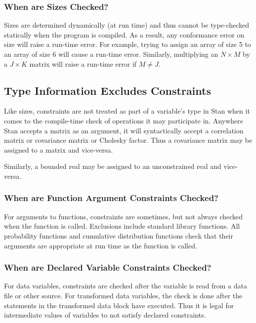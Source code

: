 \subsubsection{When are Sizes Checked?}

Sizes are determined dynamically (at run time) and thus cannot be
type-checked statically when the program is compiled.  As a result,
any conformance error on size will raise a run-time error.  For
example, trying to assign an array of size 5 to an array of size 6
will cause a run-time error.  Similarly, multiplying an $N
\times M$ by a $J \times K$ matrix will raise a run-time error if $M
\neq J$.

\subsection{Type Information Excludes Constraints}

Like sizes, constraints are not treated as part of a variable's type
in Stan when it comes to the compile-time check of operations it may
participate in.  Anywhere Stan accepts a matrix as an argument, it
will syntactically accept a correlation matrix or covariance matrix or
Cholesky factor.  Thus a covariance matrix may be assigned to a matrix
and vice-versa.

Similarly, a bounded real may be assigned to an unconstrained real and
vice-versa.

\subsubsection{When are Function Argument Constraints Checked?}

For arguments to functions, constraints are sometimes, but not always
checked when the function is called.  Exclusions include \Cpp standard
library functions.  All probability functions and cumulative
distribution functions check that their arguments are appropriate at
run time as the function is called.

\subsubsection{When are Declared Variable Constraints Checked?}

For data variables, constraints are checked after the variable is read
from a data file or other source.  For transformed data variables, the
check is done after the statements in the transformed data block have
executed.  Thus it is legal for intermediate values of variables to
not satisfy declared constraints.

